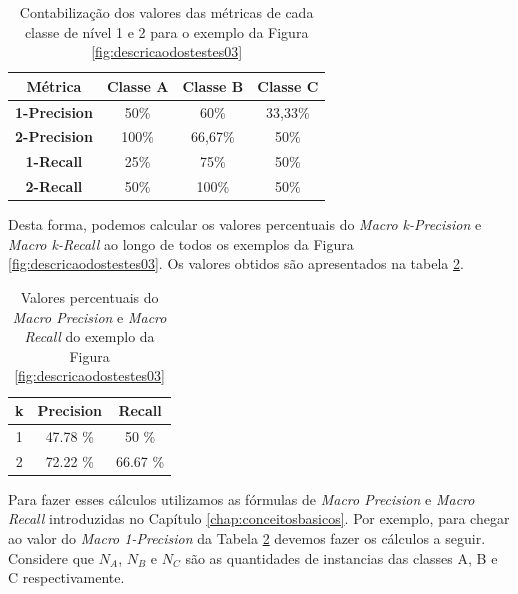 \begin{table}[h!]
  \begin{center}
    \begin{tabular}{cccc}
      \hline
       Métrica  & \textbf{Classe A} & \textbf{Classe B} & \textbf{Classe C} \\
      \hline

      \textbf{1-Precision} & 50\% & 60\% & 33,33\% \\
      \textbf{2-Precision} & 100\% & 66,67\% & 50\% \\
      \textbf{1-Recall} & 25\% & 75\% & 50\% \\
      \textbf{2-Recall} & 50\% & 100\% & 50\% \\
      
      \hline
    \end{tabular}
    \caption{Contabilização dos valores das métricas de cada classe de nível 1 e 2 para o exemplo da Figura \ref{fig:descricaodostestes03}}
    \label{tab:valores_classes}
  \end{center}
\end{table}

Desta forma, podemos calcular os valores percentuais do \textit{Macro k-Precision} e \textit{Macro k-Recall} ao longo de todos os exemplos da Figura \ref{fig:descricaodostestes03}.
Os valores obtidos são apresentados na tabela \ref{tab:valores_macro}.

\begin{table}[h!]
  \begin{center}
    \begin{tabular}{ccc}
      \hline
      \textbf{k} & \textbf{Precision} & \textbf{Recall} \\
      \hline

1	&	47.78 \%	&	50 \%	\\
2	&	72.22 \%	&	66.67 \%	\\

      \hline
    \end{tabular}
    \caption{Valores percentuais do \textit{Macro Precision} e \textit{Macro Recall} do exemplo da Figura \ref{fig:descricaodostestes03}}
    \label{tab:valores_macro}
  \end{center}
\end{table}

Para fazer esses cálculos utilizamos as fórmulas de \textit{Macro Precision} e \textit{Macro Recall} introduzidas no Capítulo \ref{chap:conceitosbasicos}.
Por exemplo, para chegar ao valor do \textit{Macro 1-Precision} da Tabela \ref{tab:valores_macro} devemos fazer os cálculos a seguir.
Considere que $N_A$, $N_B$ e $N_C$ são as quantidades de instancias das classes A, B e C respectivamente.

